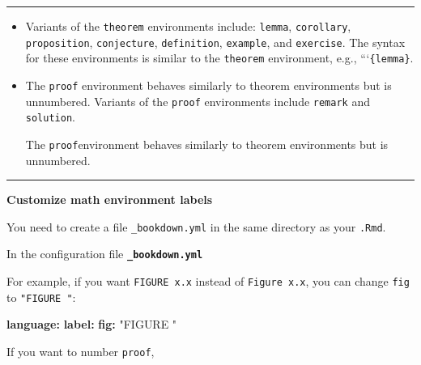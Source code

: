 \documentclass[
]{book}
\newenvironment{Shaded}{\begin{snugshade}}{\end{snugshade}}
\newcommand{\AttributeTok}[1]{\textcolor[rgb]{0.13,0.29,0.53}{#1}}
\newcommand{\FunctionTok}[1]{\textcolor[rgb]{0.13,0.29,0.53}{\textbf{#1}}}
\newcommand{\KeywordTok}[1]{\textcolor[rgb]{0.13,0.29,0.53}{\textbf{#1}}}
\newcommand{\StringTok}[1]{\textcolor[rgb]{0.31,0.60,0.02}{#1}}
\theoremstyle{definition}
\theoremstyle{definition}
\theoremstyle{definition}
\theoremstyle{definition}
\theoremstyle{remark}
\begin{document}
\begin{center}\rule{0.5\linewidth}{0.5pt}\end{center}

\begin{itemize}
\item
  Variants of the \texttt{theorem} environments include: \texttt{lemma}, \texttt{corollary}, \texttt{proposition}, \texttt{conjecture}, \texttt{definition}, \texttt{example}, and \texttt{exercise}. The syntax for these environments is similar to the \texttt{theorem} environment, e.g., ```\texttt{\{lemma\}}.
\item
  The \texttt{proof} environment behaves similarly to theorem environments but is unnumbered. Variants of the \texttt{proof} environments include \texttt{remark} and \texttt{solution}.

  The \texttt{proof}environment behaves similarly to theorem environments but is unnumbered.
\end{itemize}

\begin{center}\rule{0.5\linewidth}{0.5pt}\end{center}

\textbf{Customize math environment labels}

You need to create a file \texttt{\_bookdown.yml} in the same directory as your \texttt{.Rmd}.

In the configuration file \textbf{\texttt{\_bookdown.yml}}

For example, if you want \texttt{FIGURE\ x.x} instead of \texttt{Figure\ x.x}, you can change \texttt{fig} to \texttt{"FIGURE\ "}:

\begin{Shaded}
\begin{Highlighting}[]
\FunctionTok{language}\KeywordTok{:}
\AttributeTok{  }\FunctionTok{label}\KeywordTok{:}
\AttributeTok{    }\FunctionTok{fig}\KeywordTok{:}\AttributeTok{ }\StringTok{"FIGURE "}
\end{Highlighting}
\end{Shaded}

If you want to number \texttt{proof},
\end{document}

